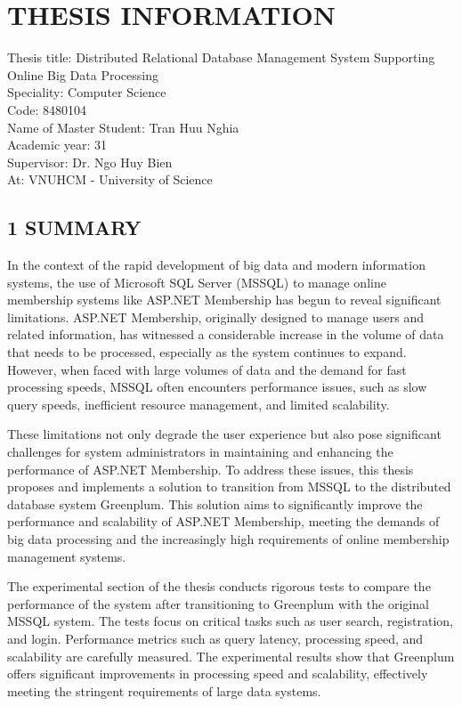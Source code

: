 
\pagebreak
{}
{}
\section*{\centering \MakeUppercase{THESIS INFORMATION}}

Thesis title: Distributed Relational Database Management System
Supporting Online Big Data Processing\\
Speciality: Computer Science \\
Code: 8480104\\
Name of Master Student: Tran Huu Nghia\\
Academic year: 31\\
Supervisor: Dr. Ngo Huy Bien\\
At: VNUHCM - University of Science



\subsection*{1 SUMMARY}
In the context of the rapid development of big data and modern information systems, the use of Microsoft SQL Server (MSSQL) to manage online membership systems like ASP.NET Membership has begun to reveal significant limitations. ASP.NET Membership, originally designed to manage users and related information, has witnessed a considerable increase in the volume of data that needs to be processed, especially as the system continues to expand. However, when faced with large volumes of data and the demand for fast processing speeds, MSSQL often encounters performance issues, such as slow query speeds, inefficient resource management, and limited scalability.

These limitations not only degrade the user experience but also pose significant challenges for system administrators in maintaining and enhancing the performance of ASP.NET Membership. To address these issues, this thesis proposes and implements a solution to transition from MSSQL to the distributed database system Greenplum. This solution aims to significantly improve the performance and scalability of ASP.NET Membership, meeting the demands of big data processing and the increasingly high requirements of online membership management systems.

The experimental section of the thesis conducts rigorous tests to compare the performance of the system after transitioning to Greenplum with the original MSSQL system. The tests focus on critical tasks such as user search, registration, and login. Performance metrics such as query latency, processing speed, and scalability are carefully measured. The experimental results show that Greenplum offers significant improvements in processing speed and scalability, effectively meeting the stringent requirements of large data systems.

